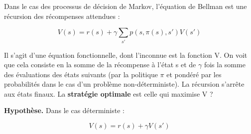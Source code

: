 \documentclass{article}
\begin{document}
Dans le cas des processus de décision de Markov, l'équation de Bellman est une récursion des récompenses attendues :

\[ V(s) = r(s) + \gamma \sum_{s'} p(s, \pi(s), s') V(s') \]

Il s'agit d'une équation fonctionnelle, dont l'inconnue est la fonction V. On voit que cela consiste en la somme de la récompense à l'état s et de $\gamma$ fois la somme des évaluations des états suivants (par la politique $\pi$ et pondéré par les probabilités dans le cas d'un problème non-déterministe). La récursion s'arrête aux états finaux. La \textbf{stratégie optimale} est celle qui maximise V ?

\textbf{Hypothèse.} Dans le cas déterministe : 

\[ V(s) = r(s) + \gamma V(s') \]
\end{document}
